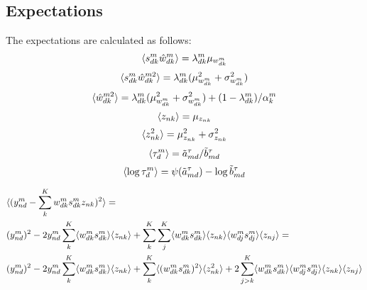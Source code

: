 \documentclass[10pt, a4paper,openany]{report}
\begin{document}
\subsection*{Expectations}
The expectations are calculated as follows:
\[
\langle s_{dk}^m \hat{w}_{dk}^m \rangle = \lambda_{dk}^m \mu_{w_{dk}^m}
\]
\[
\langle s_{dk}^m \hat{w}_{dk}^{m2} \rangle = \lambda_{dk}^m (\mu_{w_{dk}^m}^2 + \sigma_{w_{dk}^m}^2)
\]
\[
\langle \hat{w}_{dk}^{m2} \rangle = \lambda_{dk}^m(\mu_{w_{dk}^m}^2 + \sigma_{w_{dk}^m}^2) + (1-\lambda_{dk}^m)/\alpha_k^m
\]
\[
\langle z_{nk} \rangle = \mu_{z_{nk}}
\]
\[
\langle z_{nk}^2 \rangle = \mu_{z_{nk}}^2 + \sigma_{z_{nk}}^2
\]
\[
\langle \tau_d^m \rangle = \tilde{a}_{md}^\tau / \tilde{b}_{md}^\tau
\]
\[
\langle \log \tau_d^m \rangle = \psi(\tilde{a}_{md}^\tau) - \log \tilde{b}_{md}^\tau
\]

\begin{align*}
& \langle (y_{nd}^m - \sum_k^{K} w_{dk}^m s_{dk}^m z_{nk})^2 \rangle = \\
&(y_{nd}^m)^2 - 2y_{nd}^m \sum_k^{K} \langle w_{dk}^m s_{dk}^m \rangle \langle z_{nk} \rangle + \sum_k^{K}\sum_j^{K} \langle w_{dk}^m s_{dk}^m \rangle \langle z_{nk} \rangle \langle w_{dj}^m s_{dj}^m \rangle \langle z_{nj} \rangle = \\
&(y_{nd}^m)^2 - 2y_{nd}^m \sum_k^{K} \langle w_{dk}^m s_{dk}^m \rangle \langle z_{nk} \rangle + \sum_k^{K} \langle (w_{dk}^m s_{dk}^m)^2 \rangle \langle z_{nk}^2 \rangle + 2\sum_{j > k}^{K} \langle w_{dk}^m s_{dk}^m \rangle \langle w_{dj}^m s_{dj}^m \rangle \langle z_{nk} \rangle \langle z_{nj} \rangle
\end{align*}
\end{document}
